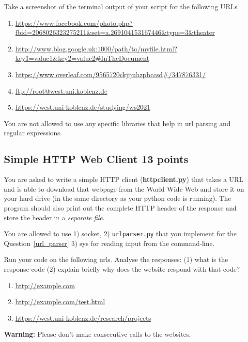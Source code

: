\documentclass{resources/WeSTassignment}
\begin{document}
Take a screenshot of the terminal output of your script for the following URLs
\begin{enumerate}
    \item \url{https://www.facebook.com/photo.php?fbid=2068026323275211&set=a.269104153167446&type=3&theater}
    \item \url{http://www.blog.google.uk:1000/path/to/myfile.html?key1=value1&key2=value2#InTheDocument}
    \item \url{https://www.overleaf.com/9565720ckjijuhzpbccsd#/347876331/}
    \item \url{ftp://root@west.uni.koblenz.de}
    \item \url{https://west.uni-koblenz.de/studying/ws2021}
    
\end{enumerate}

You are not allowed to use any specific libraries that help in url parsing and regular expressions. 

\subsection{Simple HTTP Web Client \hfill{13 points}}
You are asked to write a simple HTTP client (\textbf{httpclient.py})
that takes a URL and is able to download that webpage from the World Wide Web and store it on your hard drive (in the same
directory as your python code is running). The program should also print out the complete
HTTP header of the response and store the header in a \textit{separate file}.


You are allowed to use 1) socket, 2) \texttt{urlparser.py} that you implement for the Question~\ref{url_parser} 3) sys for reading input from the command-line. 


Run your code on the following urls. Analyse the responses: (1) what is the response code (2) explain briefly why does the website respond with that code? 
\begin{enumerate}
\item 
\url{http://example.com}
\item\url{http://example.com/test.html}
\item 
\url{https://west.uni-koblenz.de/research/projects}
\end{enumerate}

\textbf{Warning:} Please don't make consecutive calls to the websites.
\end{document}
